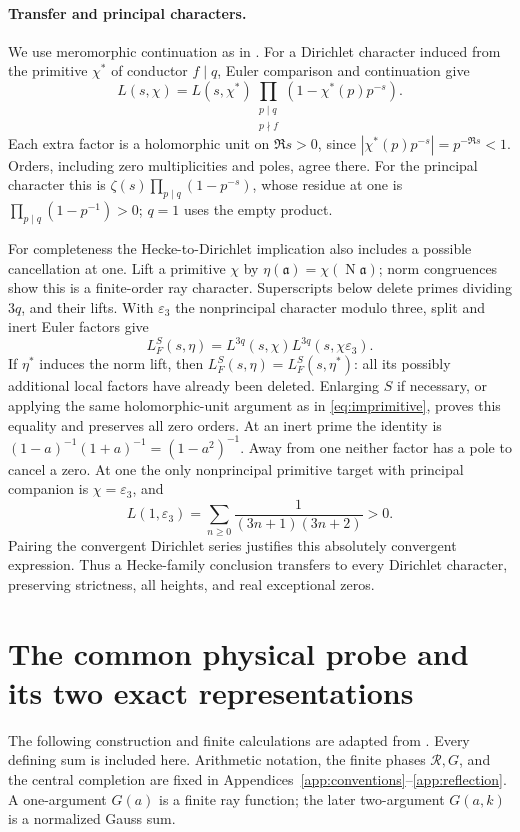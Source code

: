\documentclass[12pt]{article}
\newcommand{\N}{\operatorname{N}}
\begin{document}
\paragraph{Transfer and principal characters.}
We use meromorphic continuation as in \cite{DLMF,Poonen}.
For a Dirichlet character induced from the primitive \(\chi^*\)
of conductor \(f\mid q\), Euler comparison and continuation give
\begin{equation}\label{eq:imprimitive}
 L(s,\chi)=L(s,\chi^*)\!
 \prod_{\substack{p\mid q\\p\nmid f}}(1-\chi^*(p)p^{-s}).
\end{equation}
Each extra factor is a holomorphic unit on \(\Re s>0\), since
\(|\chi^*(p)p^{-s}|=p^{-\Re s}<1\).  Orders, including zero
multiplicities and poles, agree there.  For the principal character
this is \(\zeta(s)\prod_{p\mid q}(1-p^{-s})\), whose residue at
one is \(\prod_{p\mid q}(1-p^{-1})>0\); \(q=1\) uses the empty product.

For completeness the Hecke-to-Dirichlet implication
\cite[Proposition 11.3]{QRH} also includes a possible cancellation
at one.  Lift a primitive \(\chi\) by
\(\eta(\mathfrak a)=\chi(\N\mathfrak a)\); norm congruences show
this is a finite-order ray character.  Superscripts below delete
primes dividing \(3q\), and their lifts.  With \(\varepsilon_3\) the nonprincipal character modulo three,
split and inert Euler factors give
\[
 L_F^S(s,\eta)=L^{3q}(s,\chi)L^{3q}(s,\chi\varepsilon_3).
\]
If \(\eta^*\) induces the norm lift, then
\(L_F^S(s,\eta)=L_F^S(s,\eta^*)\): all its possibly additional
local factors have already been deleted.  Enlarging \(S\) if
necessary, or applying the same holomorphic-unit argument as
in \eqref{eq:imprimitive}, proves this equality and preserves all
zero orders.
At an inert prime the identity is
\((1-a)^{-1}(1+a)^{-1}=(1-a^2)^{-1}\).
Away from one neither factor has a pole to cancel a zero.
At one the only nonprincipal primitive target with principal
companion is \(\chi=\varepsilon_3\), and
\[
 L(1,\varepsilon_3)
 =\sum_{n\ge0}\frac1{(3n+1)(3n+2)}>0 .
\]
Pairing the convergent Dirichlet series justifies this absolutely
convergent expression.  Thus a Hecke-family conclusion transfers
to every Dirichlet character, preserving strictness, all heights,
and real exceptional zeros.

\section{The common physical probe and its two exact representations}\label{sec:common-probe}
The following construction and finite calculations are adapted from
\cite[Sections 6, 7, 12, and 16]{QRH}.  Every defining sum is
included here.  Arithmetic notation, the finite phases \(\mathcal R,G\),
and the central completion are fixed in
Appendices~\ref{app:conventions}--\ref{app:reflection}.
A one-argument \(G(a)\) is a finite ray function; the later
two-argument \(G(a,k)\) is a normalized Gauss sum.
\end{document}
